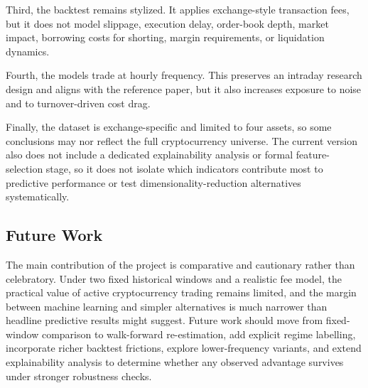 \documentclass[12pt]{article}
\begin{document}
Third, the backtest remains stylized. It applies exchange-style transaction fees, but it does not model slippage, execution delay, order-book depth, market impact, borrowing costs for shorting, margin requirements, or liquidation dynamics.

Fourth, the models trade at hourly frequency. This preserves an intraday research design and aligns with the reference paper, but it also increases exposure to noise and to turnover-driven cost drag.

Finally, the dataset is exchange-specific and limited to four assets, so some conclusions may nor reflect the full cryptocurrency universe. The current version also does not include a dedicated explainability analysis or formal feature-selection stage, so it does not isolate which indicators contribute most to predictive performance or test dimensionality-reduction alternatives systematically.

\subsection{Future Work}

The main contribution of the project is comparative and cautionary rather than celebratory. Under two fixed historical windows and a realistic fee model, the practical value of active cryptocurrency trading remains limited, and the margin between machine learning and simpler alternatives is much narrower than headline predictive results might suggest. Future work should move from fixed-window comparison to walk-forward re-estimation, add explicit regime labelling, incorporate richer backtest frictions, explore lower-frequency variants, and extend explainability analysis to determine whether any observed advantage survives under stronger robustness checks.
\end{document}
